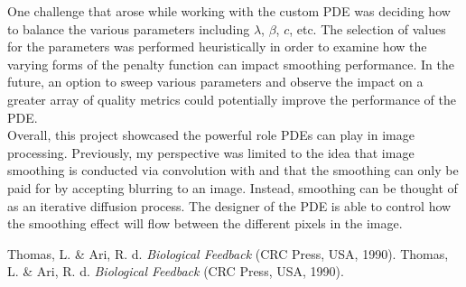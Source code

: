 \documentclass{article}
\begin{document}
  \noindent
  One challenge that arose while working with the custom PDE was deciding
  how to balance the various parameters including $\lambda$, $\beta$,
  $c$, etc. The selection of values for the parameters was performed
  heuristically in order to examine how the varying forms of the
  penalty function can impact smoothing performance. In the future,
  an option to sweep various parameters and observe the impact
  on a greater array of quality metrics could potentially improve the performance
  of the PDE.\\

  \noindent
  Overall, this project showcased the powerful role PDEs can
  play in image processing. Previously, my perspective was limited
  to the idea that image smoothing is conducted via convolution with
  and that the smoothing can only be paid for by accepting
  blurring to an image. Instead, smoothing can be thought of 
  as an iterative diffusion process. The designer of the
  PDE is able to control how the smoothing effect will
  flow between the different pixels in the image.


  \newpage
  \begin{thebibliography}{unsrt}
      Thomas, L. \& Ari, R. d. \emph{Biological Feedback} (CRC Press, USA, 1990).
      Thomas, L. \& Ari, R. d. \emph{Biological Feedback} (CRC Press, USA, 1990).
  \end{thebibliography}
\end{document}
